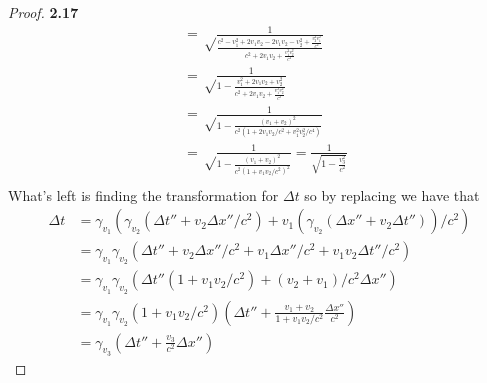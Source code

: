 \documentclass[11pt]{article}
\theoremstyle{definition}
\begin{document}
\begin{proof}{\textbf{2.17}}
\begin{align*}
                &= \sqrt\frac{1}{\frac{c^2 - v_1^2 +2v_1v_2 -2v_1v_2- v_2^2 + \frac{v_2^2v_1^2}{c^2}}{
                c^2 + 2v_1v_2 + \frac{v_1^2v_2^2}{c^2}}}\\
                &= \sqrt\frac{1}{1 - \frac{v_1^2 +2v_1v_2+ v_2^2}{
                c^2 + 2v_1v_2 + \frac{v_1^2v_2^2}{c^2}}}\\
                &= \sqrt\frac{1}{1 - \frac{(v_1 + v_2)^2}{
                c^2(1 + 2v_1v_2/c^2 + v_1^2v_2^2/c^4)}}\\
                &= \sqrt\frac{1}{1 - \frac{(v_1 + v_2)^2}{
                c^2(1 + v_1v_2/c^2)^2}} = \frac{1}{\sqrt{1 - \frac{v_3^2}{c^2}}}\\
        \end{align*}
        What's left is finding the transformation for $\Delta t$ so by replacing we
        have that
        \begin{align*}
            \Delta t &= \gamma_{v_1} (\gamma_{v_2} (\Delta t'' + v_2\Delta x''/c^2) +
             v_1(\gamma_{v_2} (\Delta x'' + v_2\Delta t''))/c^2)\\
             &= \gamma_{v_1} \gamma_{v_2} (\Delta t'' + v_2\Delta x''/c^2 +
             v_1\Delta x''/c^2 + v_1v_2\Delta t''/c^2)\\
             &= \gamma_{v_1} \gamma_{v_2} (\Delta t''(1 + v_1v_2/c^2) +
             (v_2 + v_1)/c^2 \Delta x'')\\
             &= \gamma_{v_1} \gamma_{v_2} (1 + v_1v_2/c^2) (\Delta t''
             + \frac{v_1+v_2}{1 + v_1v_2/c^2}\frac{\Delta x''}{c^2})\\
             &= \gamma_{v_3}(\Delta t'' + \frac{v_3}{c^2}\Delta x'')
        \end{align*}
    \end{proof}
\cleardoublepage
\end{document}
